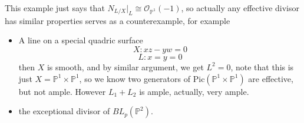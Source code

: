 \documentclass[../main.tex]{subfiles}
\begin{document}
\begin{remark}
This example just says that $N_{L/X}|_{L}\cong \mathcal{O}_{\mathbb{P}^{1}}(-1)$, so actually any effective divisor has similar properties serves as a counterexample, for example
\begin{itemize}
\item A line on a special quadric surface
$$X:xz-yw=0$$
$$L:x=y=0$$
then $X$ is smooth, and by similar argument, we get $L^{2}=0$, note that this is just $X=\mathbb{P}^{1}\times \mathbb{P}^{1}$, so we know two generators of $\mathrm{Pic}(\mathbb{P}^{1}\times \mathbb{P}^{1})$ are effective, but not ample. However $L_{1}+L_{2}$ is ample, actually, very ample.
\item the exceptional divisor of $BL_{p}(\mathbb{P}^{2})$.

\end{itemize}
\end{remark}
\end{document}
